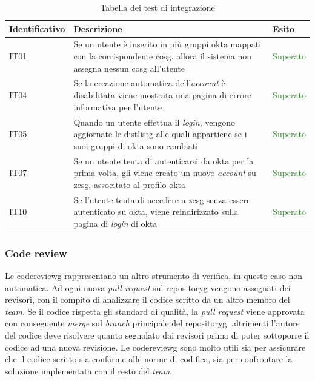 \begin{center}
    \begin{table}[h]
    \def\arraystretch{1.65}
    \begin{tabular}{|p{3cm}|p{7cm}|p{2cm}|} %
        \hline
        \textbf{Identificativo} & \textbf{Descrizione} & \textbf{Esito} \\ \hline  
        IT01 & Se un utente è inserito in più gruppi \gls{okta} mappati con la corrispondente \gls{cosg}, allora il sistema non assegna nessun \gls{cosg} all'utente & \textcolor{ForestGreen}{Superato}\\ \hline
        IT04 & Se la creazione automatica dell'\textit{account} è disabilitata viene mostrata una pagina di errore informativa per l'utente & \textcolor{ForestGreen}{Superato}\\ \hline
        IT05 & Quando un utente effettua il \textit{login}, vengono aggiornate le \gls{distlistg} alle quali appartiene se i suoi gruppi di \gls{okta} sono cambiati & \textcolor{ForestGreen}{Superato}\\ \hline
        IT07 & Se un utente tenta di autenticarsi da \gls{okta} per la prima volta, gli viene creato un nuovo \textit{account} su \gls{zcsg}, associtato al profilo \gls{okta} & \textcolor{ForestGreen}{Superato}\\ \hline
        IT10 & Se l'utente tenta di accedere a \gls{zcsg} senza essere autenticato su \gls{okta}, viene reindirizzato sulla pagina di \textit{login} di \gls{okta} & \textcolor{ForestGreen}{Superato}\\ \hline
    \end{tabular}
    \caption{Tabella dei test di integrazione}
    \end{table}
\end{center}

\subsubsection{Code review}
Le \gls{codereviewg} rappresentano un altro strumento di verifica, in questo caso non automatica. Ad ogni nuova \textit{pull request} sul \gls{repositoryg} vengono assegnati dei revisori, con il compito di analizzare il codice scritto da un altro membro del \textit{team}. Se il codice rispetta gli standard di qualità, la \textit{pull request} viene approvata con conseguente \textit{merge} sul \textit{branch} principale del \gls{repositoryg}, altrimenti l'autore del codice deve risolvere quanto segnalato dai revisori prima di poter sottoporre il codice ad una nuova revisione. Le \gls{codereviewg} sono molto utili sia per assicurare che il codice scritto sia conforme alle norme di codifica, sia per confrontare la soluzione implementata con il resto del \textit{team}.

